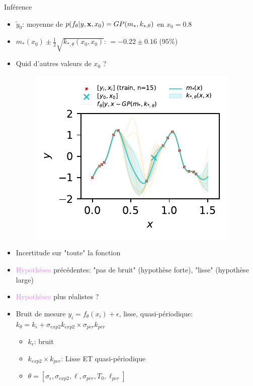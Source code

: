 \documentclass[xcolor=svgnames, t]{beamer}
\newcommand{\vectorx}[1]{\boldsymbol{\MakeLowercase{\mathbf{#1}}}}
\newcommand{\toblue}[1]{\textcolor{internationalblue}{#1}}
\newcommand{\topurple}[1]{\textcolor{violet}{#1}}
\begin{document}
\begin{frame}{\subsecname}
  \toblue{{Inférence}}
  \begin{itemize}
    \item $\tilde{y}_0$: moyenne de $p(f_\theta | y, \vectorx{x}, x_0) = GP(m_{*}, k_{*, \theta})$ en $x_0 =0.8$
    \item $m_{*}(x_0) \pm \frac{1}{2} \sqrt{k_{*, \theta}(x_0, x_0)}$: $ = -0.22 \pm 0.16$ ($95\%$)
  \end{itemize}
\end{frame}

\begin{frame}{\subsecname}
  \begin{itemize}
    \item Quid d'autres valeurs de $x_0$ ?
      \begin{figure}
        \includegraphics{gp_1D_example_noisefree_pred_meanvar.pdf}
      \end{figure}
    \item Incertitude sur "toute" la fonction
  \end{itemize}
\end{frame}

\begin{frame}{\subsecname}
  \begin{itemize}
    \item \topurple{Hypothèses} précédentes: "pas de bruit" (hypothèse forte), "lisse" (hypothèse large)
    \pause
    \item \topurple{Hypothèses} plus réalistes ?
    \pause
    \item Bruit de mesure $y_i = f_{\theta}(x_i) + \epsilon$, lisse, quasi-périodique: $k_{\theta} = k_{\epsilon} + \sigma_{exp2} k_{exp2} \times \sigma_{per} k_{per}$
      \begin{itemize}
        \item $k_{\epsilon}$: bruit
        \item $k_{exp2} \times k_{per}$: Lisse ET quasi-périodique
        \item $\theta = [\sigma_{\epsilon}, \sigma_{exp2}, \ell, \sigma_{per}, T_0, \ell_{per}]$
      \end{itemize}
  \end{itemize}
\end{frame}
\end{document}
